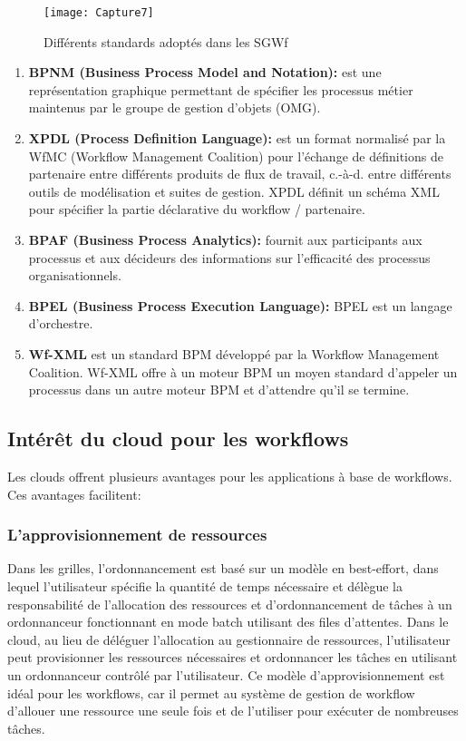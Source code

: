 \begin{figure}[!h]
	\centering
	\texttt{[image: Capture7]}
	\caption{Différents standards adoptés dans les SGWf}
	\label{fig:capture7}
\end{figure}


\begin{enumerate}
\item \textbf{ BPNM (Business Process Model and Notation):} est une représentation graphique permettant de spécifier les processus métier maintenus par le groupe de gestion d'objets (OMG). 
\item \textbf{XPDL (Process Definition Language):} est un format normalisé par la WfMC (Workflow Management Coalition) pour l’échange de définitions de partenaire entre différents produits de flux de travail, c.-à-d. entre différents outils de modélisation et suites de gestion. XPDL définit un schéma XML pour spécifier la partie déclarative du workflow / partenaire.
\item \textbf{BPAF (Business Process Analytics):} fournit aux participants aux processus et aux décideurs des informations sur l'efficacité des processus organisationnels.
\item \textbf{BPEL (Business Process Execution Language):} BPEL est un langage d'orchestre.
\item \textbf{ Wf-XML }est un standard BPM développé par la Workflow Management Coalition. Wf-XML offre à un moteur BPM un moyen standard d'appeler un processus dans un autre moteur BPM et d'attendre qu'il se termine.
\end{enumerate}
 

\subsection{ Intérêt du cloud pour les workflows }
Les clouds offrent plusieurs avantages pour les applications à base de workflows. 
Ces avantages facilitent: 
\subsubsection{L’approvisionnement de ressources }
Dans les grilles, l'ordonnancement est basé sur un modèle en best-effort, dans lequel l’utilisateur spécifie la quantité de temps nécessaire et délègue la responsabilité de l'allocation des ressources et d'ordonnancement de tâches à un ordonnanceur fonctionnant en mode batch utilisant des files d’attentes. Dans le cloud, au lieu de déléguer l’allocation au gestionnaire de ressources, l'utilisateur peut provisionner les ressources nécessaires et ordonnancer les tâches en utilisant un ordonnanceur contrôlé par l'utilisateur. Ce modèle d’approvisionnement est idéal pour les workflows, car il permet au système de gestion de workflow d'allouer une ressource une seule fois et de l'utiliser pour exécuter de nombreuses tâches. 
